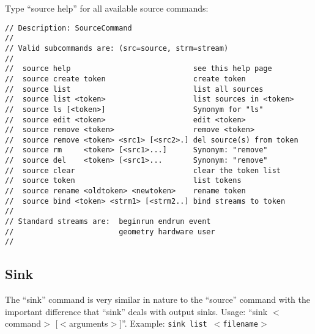 \documentclass[12pt]{article}
\begin{document}
\medskip
Type ``source help'' for all available source commands:
%
\begin{verbatim}
// Description: SourceCommand                                      
//                                                                 
// Valid subcommands are: (src=source, strm=stream)                
//                                                                 
//  source help                            see this help page      
//  source create token                    create token            
//  source list                            list all sources        
//  source list <token>                    list sources in <token> 
//  source ls [<token>]                    Synonym for "ls"      
//  source edit <token>                    edit <token>            
//  source remove <token>                  remove <token>          
//  source remove <token> <src1> [<src2>.] del source(s) from token
//  source rm     <token> [<src1>...]      Synonym: "remove"     
//  source del    <token> [<src1>...       Synonym: "remove"     
//  source clear                           clear the token list    
//  source token                           list tokens             
//  source rename <oldtoken> <newtoken>    rename token            
//  source bind <token> <strm1> [<strm2..] bind streams to token   
//                                                                 
// Standard streams are:  beginrun endrun event                    
//                        geometry hardware user                   
//                                                                 
\end{verbatim}


\subsection{Sink }
\label{sec:SinkCommand}

The ``sink'' command is very similar in nature to the ``source'' command
with the important difference that ``sink'' deals with output sinks.
Usage:
\newline ``sink $<$command$>$ [$<$arguments$>$]''. 
\newline Example: \texttt{sink list $<$filename$>$}
\end{document}

